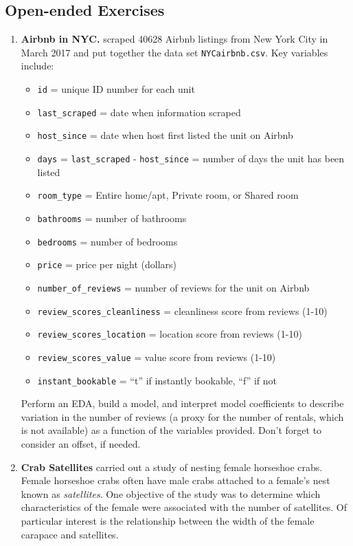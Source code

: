 \documentclass[
]{krantz}
\providecommand{\tightlist}{%
  \setlength{\itemsep}{0pt}\setlength{\parskip}{0pt}}
\begin{document}
\hypertarget{open-ended-exercises-1}{%
\subsection{Open-ended Exercises}\label{open-ended-exercises-1}}

\begin{enumerate}
\def\labelenumi{\arabic{enumi}.}
\item
  \textbf{Airbnb in NYC.} \citet{Awad2017} scraped 40628 Airbnb listings from New York City in March 2017 and put together the data set \texttt{NYCairbnb.csv}. Key variables include:

  \begin{itemize}
  \tightlist
  \item
    \texttt{id} = unique ID number for each unit
  \item
    \texttt{last\_scraped} = date when information scraped
  \item
    \texttt{host\_since} = date when host first listed the unit on Airbnb
  \item
    \texttt{days} = \texttt{last\_scraped} - \texttt{host\_since} = number of days the unit has been listed
  \item
    \texttt{room\_type} = Entire home/apt, Private room, or Shared room
  \item
    \texttt{bathrooms} = number of bathrooms
  \item
    \texttt{bedrooms} = number of bedrooms
  \item
    \texttt{price} = price per night (dollars)
  \item
    \texttt{number\_of\_reviews} = number of reviews for the unit on Airbnb
  \item
    \texttt{review\_scores\_cleanliness} = cleanliness score from reviews (1-10)
  \item
    \texttt{review\_scores\_location} = location score from reviews (1-10)
  \item
    \texttt{review\_scores\_value} = value score from reviews (1-10)
  \item
    \texttt{instant\_bookable} = ``t'' if instantly bookable, ``f'' if not
  \end{itemize}

  Perform an EDA, build a model, and interpret model coefficients to describe variation in the number of reviews (a proxy for the number of rentals, which is not available) as a function of the variables provided. Don't forget to consider an offset, if needed.
\item
  \textbf{Crab Satellites} \citet{Brockmann1996} carried out a study of nesting female horseshoe crabs. Female horseshoe crabs often have male crabs attached to a female's nest known as \emph{satellites}. One objective of the study was to determine which characteristics of the female were associated with the number of satellites. Of particular interest is the relationship between the width of the female carapace and satellites.


\end{enumerate}
\end{document}
